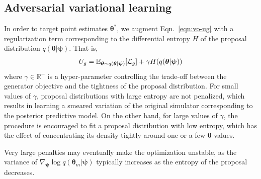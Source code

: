 \documentclass[twocolumn,superscriptaddress,aps]{revtex4-1}
\newcommand{\kcnote}[1]{\textcolor{red}{[KC: #1]}}
\newcommand{\qxpsi}{q(\mathbf{x}|\bfpsi)}
\newcommand{\bftheta}{{\bm \theta}}
\newcommand{\bfpsi}{{\bm \psi}}
\newcommand{\bfx}{\mathbf{x}}
\theoremstyle{plain}
\begin{document}




\subsection{Adversarial variational learning}

In order to target point estimates $\bftheta^*$, we augment Eqn.~\ref{eqn:vo-ug}
with a regularization term corresponding to the differential entropy $H$ of
the proposal distribution $q(\bftheta | \bfpsi)$. That is,
\begin{equation}
    U_g = \mathbb{E}_{\bftheta \sim q(\bftheta|\bfpsi)} [ {\cal L}_g ] + \gamma H(q(\bftheta|\bfpsi))
\end{equation}
where $\gamma \in \mathbb{R}^+$ is a hyper-parameter controlling the trade-off
between the generator objective and the tightness of the proposal distribution.
For small values of $\gamma$,
proposal distributions with large entropy are not penalized, which results
in learning a smeared variation of the original simulator corresponding to the posterior predictive model. On the other hand,
for large values of $\gamma$, the procedure is encouraged to fit a proposal
distribution with low entropy, which has the effect of concentrating its density
tightly around one or a few $\bftheta$ values.  

Very large penalties may 
eventually make the optimization unstable, as the variance of $\nabla_\bfpsi \log q(\bftheta_m|\bfpsi)$
typically increases as the entropy of the proposal decreases. 

\end{document}
